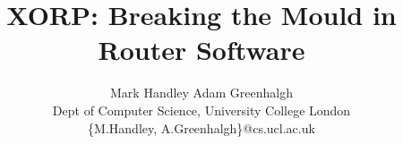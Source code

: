 \documentclass[10pt,a4paper]{lcs}
\begin{document}
\title{{\sffamily\bfseries XORP: Breaking the Mould in Router Software}}

\author{{\sffamily Mark Handley \qquad Adam Greenhalgh} \\
\noalign{\vskip4pt}
{\sffamily{}\fontsize{9}{11}\selectfont
Dept of Computer Science,
University College London}\\
{\sffamily\fontsize{9}{11}\selectfont
\{M.Handley, A.Greenhalgh\}@cs.ucl.ac.uk}}
\date{}

\maketitle
\vspace{-0.2in}





\vspace{-0.05in}


\vspace{-0.05in}

\small

\end{document}
